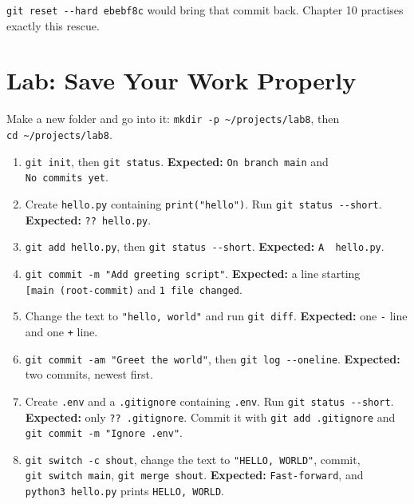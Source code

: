 \texttt{git\ reset\ -}\allowbreak{}\texttt{-}\allowbreak{}\texttt{hard\ ebebf8c} would bring that commit back. Chapter 10 practises exactly this rescue.

\section{Lab: Save Your Work Properly}\label{08-git-every-day:lab-save-your-work-properly}

Make a new folder and go into it: \texttt{mkdir\ -}\allowbreak{}\texttt{p\ \textasciitilde{}/}\allowbreak{}\texttt{projects/}\allowbreak{}\texttt{lab8}, then \texttt{cd\ \textasciitilde{}/}\allowbreak{}\texttt{projects/}\allowbreak{}\texttt{lab8}.

\begin{enumerate}
\def\labelenumi{\arabic{enumi}.}
\tightlist
\item
  \texttt{git\ init}, then \texttt{git\ status}. \textbf{Expected:} \texttt{On\ branch\ main} and \texttt{No\ commits\ yet}.
\item
  Create \texttt{hello.py} containing \texttt{print("hello")}. Run \texttt{git\ status\ -\/-short}. \textbf{Expected:} \texttt{??\ hello.py}.
\item
  \texttt{git\ add\ hello.py}, then \texttt{git\ status\ -\/-short}. \textbf{Expected:} \texttt{A\ \ hello.py}.
\item
  \texttt{git\ commit\ -}\allowbreak{}\texttt{m\ "Add\ greeting\ script"}. \textbf{Expected:} a line starting \texttt{{[}main\ (root-commit)} and \texttt{1\ file\ changed}.
\item
  Change the text to \texttt{"hello,\ world"} and run \texttt{git\ diff}. \textbf{Expected:} one \texttt{-} line and one \texttt{+} line.
\item
  \texttt{git\ commit\ -}\allowbreak{}\texttt{am\ "Greet\ the\ world"}, then \texttt{git\ log\ -\/-oneline}. \textbf{Expected:} two commits, newest first.
\item
  Create \texttt{.env} and a \texttt{.gitignore} containing \texttt{.env}. Run \texttt{git\ status\ -\/-short}. \textbf{Expected:} only \texttt{??\ .gitignore}. Commit it with \texttt{git\ add\ .gitignore} and \texttt{git\ commit\ -}\allowbreak{}\texttt{m\ "Ignore\ .}\allowbreak{}\texttt{env"}.
\item
  \texttt{git\ switch\ -c\ shout}, change the text to \texttt{"HELLO,\ WORLD"}, commit, \texttt{git\ switch\ main}, \texttt{git\ merge\ shout}. \textbf{Expected:} \texttt{Fast-forward}, and \texttt{python3\ hello.py} prints \texttt{HELLO,\ WORLD}.

\end{enumerate}

